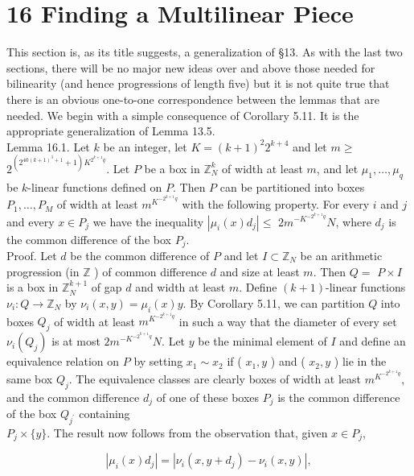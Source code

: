 \documentclass[10pt]{article}
\begin{document}
\section*{16 Finding a Multilinear Piece}
This section is, as its title suggests, a generalization of §13. As with the last two sections, there will be no major new ideas over and above those needed for bilinearity (and hence progressions of length five) but it is not quite true that there is an obvious one-to-one correspondence between the lemmas that are needed. We begin with a simple consequence of Corollary 5.11. It is the appropriate generalization of Lemma 13.5.\\
Lemma 16.1. Let $k$ be an integer, let $K=(k+1)^{2} 2^{k+4}$ and let $m \geqslant$ $2^{\left(2^{40(k+1)^{3}+1}+1\right)K^{2^{k+1} q}}$. Let $P$ be a box in $\mathbb{Z}_{N}^{k}$ of width at least $m$, and let $\mu_{1}, \ldots, \mu_{q}$ be $k$-linear functions defined on $P$. Then $P$ can be partitioned into boxes $P_{1}, \ldots, P_{M}$ of width at least $m^{K^{-2^{k+1} q}}$ with the following property. For every $i$ and $j$ and every $x \in P_{j}$ we have the inequality $\left|\mu_{i}(x) d_{j}\right| \leqslant$ $2 m^{-K^{-2^{k+1} q}} N$, where $d_{j}$ is the common difference of the box $P_{j}$.\\
Proof. Let $d$ be the common difference of $P$ and let $I \subset \mathbb{Z}_{N}$ be an arithmetic progression (in $\mathbb{Z}$ ) of common difference $d$ and size at least $m$. Then $Q=$ $P \times I$ is a box in $\mathbb{Z}_{N}^{k+1}$ of gap $d$ and width at least $m$. Define $(k+1)$-linear functions $\nu_{i}: Q \rightarrow \mathbb{Z}_{N}$ by $\nu_{i}(x, y)=\mu_{i}(x) y$. By Corollary 5.11, we can partition $Q$ into boxes $Q_{j}$ of width at least $m^{K^{-2^{k+1} q}}$ in such a way that the diameter of every set $\nu_{i}\left(Q_{j}\right)$ is at most $2 m^{-K^{-2^{k+1} q}} N$. Let $y$ be the minimal element of $I$ and define an equivalence relation on $P$ by setting $x_{1} \sim x_{2}$ if ( $x_{1}, y$ ) and ( $x_{2}, y$ ) lie in the same box $Q_{j}$. The equivalence classes are clearly boxes of width at least $m^{K^{-2^{k+1} q}}$, and the common difference $d_{j}$ of one of these boxes $P_{j}$ is the common difference of the box $Q_{j^{\prime}}$ containing\\
$P_{j} \times\{y\}$. The result now follows from the observation that, given $x \in P_{j}$,

$$
\left|\mu_{i}(x) d_{j}\right|=\left|\nu_{i}\left(x, y+d_{j}\right)-\nu_{i}(x, y)\right|,
$$
\end{document}
